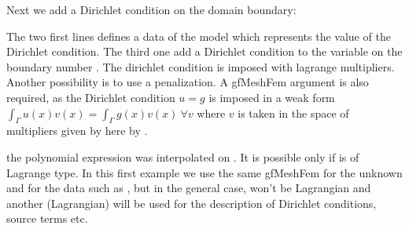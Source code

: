 \documentclass[a4paper,11pt,english]{sphinxmanual}
\begin{document}
\sphinxAtStartPar
Next we add a Dirichlet condition on the domain boundary:

\begin{sphinxVerbatim}[commandchars=\\\{\}]
\end{sphinxVerbatim}

\sphinxAtStartPar
The two first lines defines a data of the model which represents the value of the
Dirichlet condition. The third one add a Dirichlet condition to the variable 
on the boundary number . The dirichlet condition is imposed with lagrange
multipliers. Another possibility is to use a penalization. A gfMeshFem argument is
also required, as the Dirichlet condition \(u=g\) is imposed in a weak form
\(\int_\Gamma u(x)v(x) = \int_\Gamma g(x)v(x) ~ \forall v\) where \(v\) is
taken in the space of multipliers given by here by .

\begin{sphinxShadowBox}

\sphinxAtStartPar
the polynomial expression was interpolated on . It is possible only if
 is of Lagrange type. In this first example we use the same gfMeshFem for
the unknown and for the data such as , but in the general case, 
won’t be Lagrangian and another (Lagrangian)  will be used for the
description of Dirichlet conditions, source terms etc.
\end{sphinxShadowBox}
\end{document}
